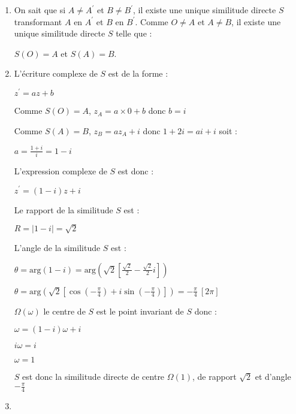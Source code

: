 \begin{corrige}
     \begin{enumerate}
          \item
          On sait que si $A\neq A^{\prime}$ et $B\neq B^{\prime}$, il existe une unique similitude directe $S$ transformant $A$ en $A^{\prime}$ et $B$ en $B^{\prime}$. Comme $O\neq A$ et $A\neq B$, il existe une unique similitude directe $S$ telle que :
          \par
          $S\left(O\right)=A$ et $S\left(A\right)=B$.
          \item
          L'écriture complexe de $S$ est de la forme :
          \par
          $z^{\prime}=az+b$
          \par
          Comme $S\left(O\right)=A$, $z_{A}=a\times 0+b$ donc $b=i$
          \par
          Comme $S\left(A\right)=B$, $z_{B}=az_{A}+i$ donc $1+2i=ai+i$ soit :
          \par
          $a=\frac{1+i}{i}=1-i$
          \par
          L'expression complexe de $S$ est donc :
          \par
          $z^{\prime}=\left(1-i\right)z+i$
          \par
          Le rapport de la similitude $S$ est :
          \par
          $R=|1-i|=\sqrt{2}$
          \par
          L'angle de la similitude $S$ est :
          \par
          $\theta =\text{arg}\left(1-i\right)=\text{arg}\left(\sqrt{2}\left[\frac{\sqrt{2}}{2}-\frac{\sqrt{2}}{2}i\right]\right)$
          \par
          $\theta =\text{arg}\left(\sqrt{2}\left[\cos\left(-\frac{\pi }{4}\right)+i\sin\left(-\frac{\pi }{4}\right)\right]\right)=-\frac{\pi }{4}\ \left[2\pi \right]$
          \par
          $\Omega \left(\omega \right)$ le centre de $S$ est le point invariant de $S$ donc :
          \par
          $\omega =\left(1-i\right)\omega +i$
          \par
          $i \omega =i$
          \par
          $\omega =1$
          \par
          $S$ est donc la similitude directe de centre $\Omega \left(1\right)$, de rapport $\sqrt{2}$ et d'angle $-\frac{\pi }{4}$
          \item

\end{enumerate}
\end{corrige}
